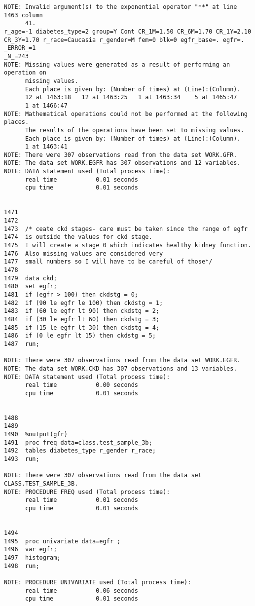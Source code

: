 \documentclass{article}\usepackage[]{graphicx}\usepackage[]{color}
\begin{document}
\begin{verbatim}
NOTE: Invalid argument(s) to the exponential operator "**" at line 1463 column
      41.
r_age=-1 diabetes_type=2 group=Y Cont CR_1M=1.50 CR_6M=1.70 CR_1Y=2.10
CR_3Y=1.70 r_race=Caucasia r_gender=M fem=0 blk=0 egfr_base=. egfr=. _ERROR_=1
_N_=243
NOTE: Missing values were generated as a result of performing an operation on
      missing values.
      Each place is given by: (Number of times) at (Line):(Column).
      12 at 1463:18   12 at 1463:25   1 at 1463:34    5 at 1465:47
      1 at 1466:47
NOTE: Mathematical operations could not be performed at the following places.
      The results of the operations have been set to missing values.
      Each place is given by: (Number of times) at (Line):(Column).
      1 at 1463:41
NOTE: There were 307 observations read from the data set WORK.GFR.
NOTE: The data set WORK.EGFR has 307 observations and 12 variables.
NOTE: DATA statement used (Total process time):
      real time           0.01 seconds
      cpu time            0.01 seconds


1471
1472
1473  /* ceate ckd stages- care must be taken since the range of egfr
1474  is outside the values for ckd stage.
1475  I will create a stage 0 which indicates healthy kidney function.
1476  Also missing values are considered very
1477  small numbers so I will have to be careful of those*/
1478
1479  data ckd;
1480  set egfr;
1481  if (egfr > 100) then ckdstg = 0;
1482  if (90 le egfr le 100) then ckdstg = 1;
1483  if (60 le egfr lt 90) then ckdstg = 2;
1484  if (30 le egfr lt 60) then ckdstg = 3;
1485  if (15 le egfr lt 30) then ckdstg = 4;
1486  if (0 le egfr lt 15) then ckdstg = 5;
1487  run;

NOTE: There were 307 observations read from the data set WORK.EGFR.
NOTE: The data set WORK.CKD has 307 observations and 13 variables.
NOTE: DATA statement used (Total process time):
      real time           0.00 seconds
      cpu time            0.01 seconds


1488
1489
1490  %output(gfr)
1491  proc freq data=class.test_sample_3b;
1492  tables diabetes_type r_gender r_race;
1493  run;

NOTE: There were 307 observations read from the data set CLASS.TEST_SAMPLE_3B.
NOTE: PROCEDURE FREQ used (Total process time):
      real time           0.01 seconds
      cpu time            0.01 seconds


1494
1495  proc univariate data=egfr ;
1496  var egfr;
1497  histogram;
1498  run;

NOTE: PROCEDURE UNIVARIATE used (Total process time):
      real time           0.06 seconds
      cpu time            0.01 seconds



\end{verbatim}
\end{document}
